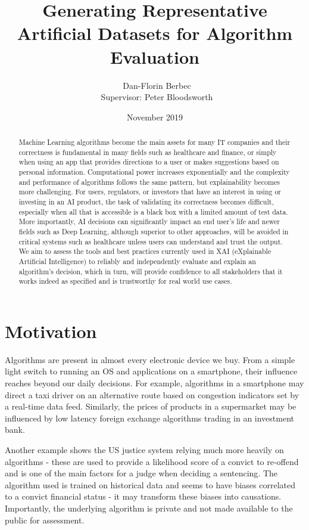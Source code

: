 \documentclass[proposal]{softeng}
\title{Generating Representative Artificial Datasets for Algorithm Evaluation}
\author{\ Dan-Florin Berbec \\ \ Supervisor: Peter Bloodsworth}
\date{November 2019}
\begin{document}
\maketitle

\newpage
\clearpage\mbox{}\clearpage

\begin{abstract}
Machine Learning algorithms become the main assets for many IT companies and their correctness is fundamental in many fields such as healthcare and finance, or simply when using an app that provides directions to a user or makes suggestions based on personal information. Computational power increases exponentially and the complexity and performance of algorithms follows the same pattern, but explainability becomes more challenging. For users, regulators, or investors that have an interest in using or investing in an AI product, the task of validating its correctness becomes difficult, especially when all that is accessible is a black box with a limited amount of test data. More importantly, AI decisions can significantly impact an end user's life and newer fields such as Deep Learning, although superior to other approaches, will be avoided in critical systems such as healthcare unless users can understand and trust the output. We aim to assess the tools and best practices currently used in XAI (eXplainable Artificial Intelligence) to reliably and independently evaluate and explain an algorithm's decision, which in turn, will provide confidence to all stakeholders that it works indeed as specified and is trustworthy for real world use cases.\end{abstract}
 
\tableofcontents
\newpage

\section{Motivation}
Algorithms are present in almost every electronic device we buy. From a simple light switch to running an OS and applications on a smartphone, their influence reaches beyond our daily decisions. For example, algorithms in a smartphone may direct a taxi driver on an alternative route based on congestion indicators set by a real-time data feed. Similarly, the prices of products in a supermarket may be influenced by low latency foreign exchange algorithms trading in an investment bank.

Another example shows the US justice system relying much more heavily on algorithms - these are used to provide a likelihood score of a convict to re-offend and is one of the main factors for a judge when deciding a sentencing\cite{jail}. The algorithm used is trained on historical data and seems to have biases correlated to a convict financial status - it may transform these biases into causations. Importantly, the underlying algorithm is private and not made available to the public for assessment.
\end{document}
